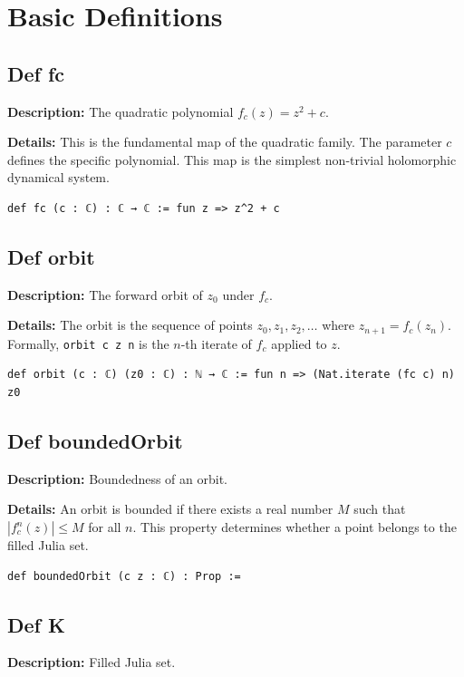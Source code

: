 \section{Basic Definitions}

\subsection*{Def fc}
\textbf{Description:} The quadratic polynomial $f_c(z) = z^2 + c$.

\textbf{Details:} This is the fundamental map of the quadratic family. The parameter $c$ defines the specific polynomial.
This map is the simplest non-trivial holomorphic dynamical system.

\begin{lstlisting}[language=Lean]
def fc (c : ℂ) : ℂ → ℂ := fun z => z^2 + c
\end{lstlisting}

\subsection*{Def orbit}
\textbf{Description:} The forward orbit of $z_0$ under $f_c$.

\textbf{Details:} The orbit is the sequence of points $z_0, z_1, z_2, \dots$ where $z_{n+1} = f_c(z_n)$.
Formally, \texttt{orbit c z n} is the $n$-th iterate of $f_c$ applied to $z$.

\begin{lstlisting}[language=Lean]
def orbit (c : ℂ) (z0 : ℂ) : ℕ → ℂ := fun n => (Nat.iterate (fc c) n) z0
\end{lstlisting}

\subsection*{Def boundedOrbit}
\textbf{Description:} Boundedness of an orbit.

\textbf{Details:} An orbit is bounded if there exists a real number $M$ such that $|f_c^n(z)| \le M$ for all $n$.
This property determines whether a point belongs to the filled Julia set.

\begin{lstlisting}[language=Lean]
def boundedOrbit (c z : ℂ) : Prop :=
\end{lstlisting}

\subsection*{Def K}
\textbf{Description:} Filled Julia set.

